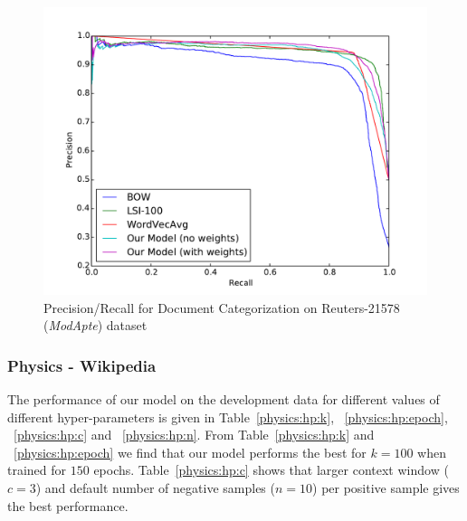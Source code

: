 \begin{figure}[tb]
\centering
        \includegraphics[width=0.8\columnwidth]{figs/pr/reuter-cs.pdf}
    \caption{\footnotesize Precision/Recall for Document Categorization on Reuters-21578 (\emph{ModApte}) dataset} 
    \label{fig:pr:reuter:cs}
\end{figure}

\subsubsection{Physics - Wikipedia}
The performance of our model on the development data for different values of different hyper-parameters is given in Table~\ref{physics:hp:k}, ~\ref{physics:hp:epoch}, ~\ref{physics:hp:c} and ~\ref{physics:hp:n}. From Table~\ref{physics:hp:k} and ~\ref{physics:hp:epoch} we find that our model performs the best for $k=100$ when trained for $150$ epochs. Table~\ref{physics:hp:c} shows that larger context window ($c = 3$) and default number of negative samples ($n = 10$) per positive sample gives the best performance. 

